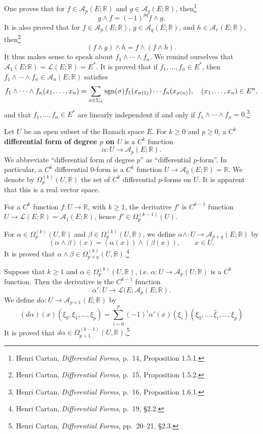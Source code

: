 \documentclass{article}
\newcommand{\sgn}{\ensuremath\mathrm{sgn}}
\theoremstyle{definition}
\begin{document}
One proves that for $f \in \mathscr{A}_p(E;\mathbb{R})$ and $g \in \mathscr{A}_q(E;\mathbb{R})$,
then\footnote{Henri Cartan,
{\em Differential Forms}, p.~14, Proposition 1.5.1.}
\[
g \wedge f = (-1)^{pq} f \wedge g.
\]
It is also proved that for $f \in \mathscr{A}_p(E;\mathbb{R})$, 
$g \in \mathscr{A}_q(E;\mathbb{R})$, and
$h \in \mathscr{A}_r(E;\mathbb{R})$, then\footnote{Henri Cartan,
{\em Differential Forms}, p.~15, Proposition 1.5.2.}
\[
(f \wedge g) \wedge h = f \wedge (f \wedge h).
\]
It thus makes sense to speak about $f_1 \wedge  \cdots \wedge f_n$. 
We remind ourselves that $\mathscr{A}_1(E;\mathbb{R})=\mathscr{L}(E;\mathbb{R})=E^*$.
It is proved that if $f_1,\ldots,f_n \in E^*$, then $f_1 \wedge \cdots \wedge f_n
\in \mathscr{A}_n(E;\mathbb{R})$ satisfies
\[
f_1 \wedge \cdots \wedge f_n (x_1,\ldots,x_n) = \sum_{\sigma \in \Sigma_n}
\sgn(\sigma) f_1(x_{\sigma(1)}) \cdots f_n(x_{\sigma(n)}),
\quad (x_1,\ldots,x_n) \in E^n,
\]
and that $f_1,\ldots,f_n \in E^*$ are linearly independent if and only if
$f_1 \wedge \cdots \wedge f_n=0$.\footnote{Henri Cartan,
{\em Differential Forms}, p.~16, Proposition 1.6.1.}


Let $U$ be an open subset of the Banach space $E$. 
For $k \geq 0$ and $p \geq 0$, a \textbf{$C^k$ differential form of degree $p$ on $U$}
is a $C^k$ function
\[
\alpha: U \to \mathscr{A}_p(E;\mathbb{R}). 
\]
We abbreviate ``differential form of degree $p$'' as ``differential $p$-form''.
In particular, a $C^k$ differential $0$-form is a $C^k$ function $U \to \mathscr{A}_0(E;\mathbb{R})
=\mathbb{R}$.
We denote by $\Omega_p^{(k)}(U,\mathbb{R})$ the set of $C^k$ differential
$p$-forms on $U$. It is apparent that this is a real vector space. 

For a $C^k$ function $f:U \to \mathbb{R}$, with $k \geq 1$,
the derivative $f'$ is $C^{k-1}$ function
$U \to \mathscr{L}(E;\mathbb{R})=\mathscr{A}_1(E;\mathbb{R})$, hence
$f' \in \Omega_p^{(k-1)}(U)$. 

For $\alpha \in \Omega_p^{(k)}(U,\mathbb{R})$ and 
$\beta \in \Omega_q^{(k)}(U,\mathbb{R})$, we define
$\alpha \wedge:U \to \mathscr{A}_{p+q}(E;\mathbb{R})$ by
\[
(\alpha \wedge \beta)(x) = (\alpha(x)) \wedge (\beta(x)), \qquad x \in U.
\]
It is proved that $\alpha \wedge \beta \in \Omega_{p+q}^{(k)}(U,\mathbb{R})$.\footnote{Henri Cartan,
{\em Differential Forms}, p.~19, \S 2.2.}

Suppose that $k \geq 1$ and $\alpha \in \Omega_p^{(k)}(U,\mathbb{R})$, i.e.
$\alpha:U \to \mathscr{A}_p(U;\mathbb{R})$ is a $C^k$ function. Then
the derivative is the $C^{k-1}$ function
\[
\alpha':U \to \mathscr{L}(E;\mathscr{A}_p(E;\mathbb{R}).
\]
We define $d\alpha:U \to \mathscr{A}_{p+1}(E;\mathbb{R})$ by
\[
(d\alpha)(x)(\xi_0,\xi_1,\ldots,\xi_p)
=\sum_{i=0}^p (-1)^i \alpha'(x)(\xi_i)(\xi_0,\ldots,\hat{\xi}_i,\ldots,\xi_p)
\]
It is proved that $d\alpha \in \Omega_{p+1}^{(k-1)}(U,\mathbb{R})$.\footnote{Henri Cartan,
{\em Differential Forms}, pp.~20--21, \S 2.3.}
\end{document}

